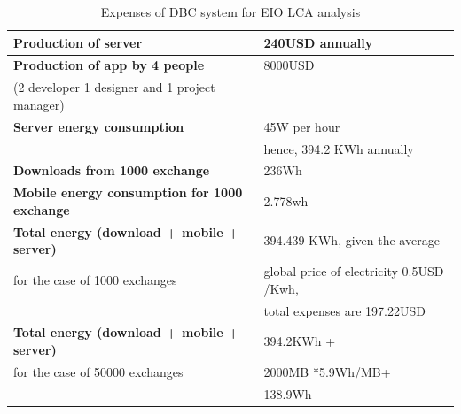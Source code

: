 \documentclass[conference]{IEEEtran}
\begin{document}
\begin{table}[htbp]
\caption{Expenses of DBC system for EIO LCA analysis}
\begin{center}
\begin{tabular}{|l|l|}
\hline
\textbf{Production of server} & 240USD annually \\ \hline
\textbf{Production of app by 4 people} & 8000USD \\ %
(2 developer 1 designer and 1 project manager) &  \\ \hline
\textbf{Server energy consumption} & 45W per hour \\ %
 & hence, 394.2 KWh annually \\ \hline
\textbf{Downloads from 1000 exchange} & 236Wh \\ \hline
\textbf{Mobile energy consumption for 1000 exchange} & 2.778wh \\ \hline
\textbf{Total energy (download + mobile + server)} & 394.439 KWh, given the average \\
 for the case of 1000 exchanges & global price of electricity 0.5USD /Kwh,\\
& total expenses are 197.22USD \\  \hline

\textbf{Total energy  (download + mobile + server)} & 394.2KWh +  \\ %
 for the case of 50000 exchanges & 2000MB *5.9Wh/MB+ \\ %
 & 138.9Wh \\ \hline
\end{tabular}
\end{center}
\label{PBCcalc}
\end{table}
\end{document}
